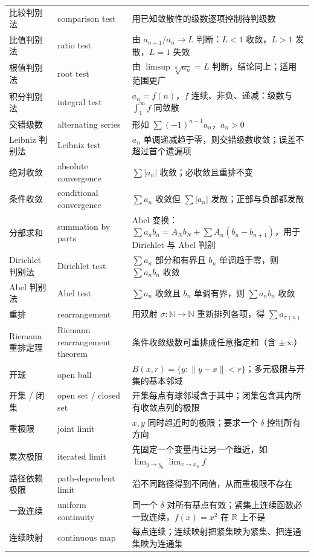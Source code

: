 \documentclass[UTF8,11pt,a4paper]{ctexart}
\begin{document}
\begin{longtable}{@{}p{3.4cm}p{5.4cm}p{7.0cm}@{}}
比较判别法 & comparison test & 用已知敛散性的级数逐项控制待判级数\\
比值判别法 & ratio test & 由 $a_{n+1}/a_n\to L$ 判断：$L<1$ 收敛，$L>1$ 发散，$L=1$ 失效\\
根值判别法 & root test & 由 $\limsup\sqrt[n]{a_n}=L$ 判断，结论同上；适用范围更广\\
积分判别法 & integral test & $a_n=f(n)$，$f$ 连续、非负、递减：级数与 $\int_1^\infty f$ 同敛散\\
交错级数 & alternating series & 形如 $\sum(-1)^{n-1}a_n$，$a_n>0$\\
Leibniz 判别法 & Leibniz test & $a_n$ 单调递减趋于零，则交错级数收敛；误差不超过首个遗漏项\\
绝对收敛 & absolute convergence & $\sum|a_n|$ 收敛；必收敛且重排不变\\
条件收敛 & conditional convergence & $\sum a_n$ 收敛但 $\sum|a_n|$ 发散；正部与负部都发散\\
分部求和 & summation by parts & Abel 变换：$\sum a_nb_n=A_Nb_N+\sum A_n(b_n-b_{n+1})$，用于 Dirichlet 与 Abel 判别\\
Dirichlet 判别法 & Dirichlet test & $\sum a_n$ 部分和有界且 $b_n$ 单调趋于零，则 $\sum a_nb_n$ 收敛\\
Abel 判别法 & Abel test & $\sum a_n$ 收敛且 $b_n$ 单调有界，则 $\sum a_nb_n$ 收敛\\
重排 & rearrangement & 用双射 $\sigma:\mathbb N\to\mathbb N$ 重新排列各项，得 $\sum a_{\sigma(n)}$\\
Riemann 重排定理 & Riemann rearrangement theorem & 条件收敛级数可重排成任意指定和（含 $\pm\infty$）\\
开球 & open ball & $B(x,r)=\{y:\|y-x\|<r\}$；多元极限与开集的基本邻域\\
开集 / 闭集 & open set / closed set & 开集每点有球邻域含于其中；闭集包含其内所有收敛点列的极限\\
重极限 & joint limit & $x,y$ 同时趋近时的极限；要求一个 $\delta$ 控制所有方向\\
累次极限 & iterated limit & 先固定一个变量再让另一个趋近，如 $\lim_{y\to y_0}\lim_{x\to x_0}f$\\
路径依赖极限 & path-dependent limit & 沿不同路径得到不同值，从而重极限不存在\\
一致连续 & uniform continuity & 同一个 $\delta$ 对所有基点有效；紧集上连续函数必一致连续，$f(x)=x^2$ 在 $\mathbb R$ 上不是\\
连续映射 & continuous map & 每点连续；连续映射把紧集映为紧集、把连通集映为连通集\\
\end{longtable}
\end{document}
